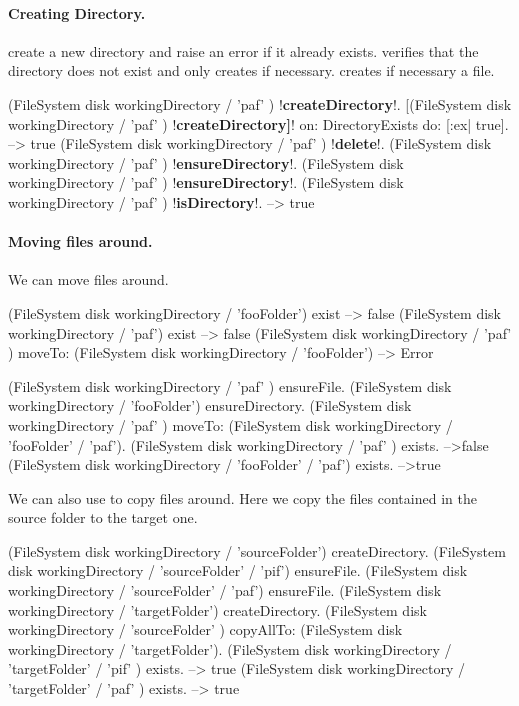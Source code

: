 \documentclass[a4paper,10pt,twoside]{book}
\begin{document}
\paragraph{Creating Directory.}
 create a new directory and raise an error if it already exists. 
 verifies that the directory does not exist and only creates if necessary.
 creates if necessary a file.
 
 
\begin{code}{} 
(FileSystem disk workingDirectory / 'paf' ) !\textbf{createDirectory}!.
[(FileSystem disk workingDirectory / 'paf' ) !\textbf{createDirectory]}! on: DirectoryExists do: [:ex| true].
	--> true
(FileSystem disk workingDirectory / 'paf' ) !\textbf{delete}!.
(FileSystem disk workingDirectory / 'paf' ) !\textbf{ensureDirectory}!.
(FileSystem disk workingDirectory / 'paf' ) !\textbf{ensureDirectory}!.
(FileSystem disk workingDirectory / 'paf' ) !\textbf{isDirectory}!.
  --> true
\end{code}

\paragraph{Moving files around.}

We can move files around. 
\begin{code}{}
(FileSystem disk workingDirectory / 'fooFolder') exist
  --> false
(FileSystem disk workingDirectory / 'paf') exist
  --> false
(FileSystem disk workingDirectory / 'paf' ) moveTo: (FileSystem disk workingDirectory / 'fooFolder')
 --> Error

(FileSystem disk workingDirectory / 'paf' ) ensureFile.
(FileSystem disk workingDirectory / 'fooFolder') ensureDirectory. 
(FileSystem disk workingDirectory / 'paf' ) moveTo: (FileSystem disk workingDirectory / 'fooFolder' / 'paf').
(FileSystem disk workingDirectory / 'paf' ) exists.
	-->false
(FileSystem disk workingDirectory / 'fooFolder' / 'paf') exists.
	-->true
\end{code}


We can also use  to copy files around. Here we copy the files contained in the source folder to the target one. 

\begin{code}{}
(FileSystem disk workingDirectory / 'sourceFolder') createDirectory. 
(FileSystem disk workingDirectory /  'sourceFolder' / 'pif') ensureFile.
(FileSystem disk workingDirectory /  'sourceFolder' / 'paf') ensureFile.
(FileSystem disk workingDirectory / 'targetFolder') createDirectory. 
(FileSystem disk workingDirectory / 'sourceFolder' ) copyAllTo: (FileSystem disk workingDirectory / 'targetFolder').
(FileSystem disk workingDirectory /  'targetFolder' / 'pif' ) exists.
  --> true
(FileSystem disk workingDirectory /  'targetFolder' / 'paf' ) exists.
 --> true
 \end{code}
\end{document}
